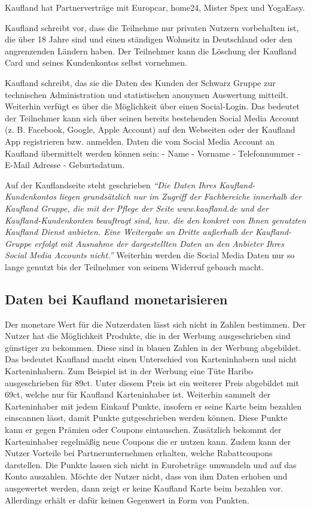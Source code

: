 \noindent Kaufland hat Partnerverträge mit Europcar, home24, Mister Spex und YogaEasy. \cite{Kaufland_FAQ} \newline

\noindent Kaufland schreibt vor, dass die Teilnehme nur privaten Nutzern vorbehalten ist, die über 18 Jahre sind und einen ständigen Wohnsitz in Deutschland oder den angrenzenden Ländern haben. Der Teilnehmer kann die Löschung der Kaufland Card und seines Kundenkontos selbst vornehmen. \cite{Kaufland_Datenschutz} \newline

\noindent Kaufland schreibt, das sie die Daten des Kunden der Schwarz Gruppe zur technischen Administration und statistischen anonymen Auswertung mitteilt. Weiterhin verfügt es über die Möglichkeit über einen Social-Login. Das bedeutet der Teilnehmer kann sich über seinen bereits bestehenden Social Media Account (z. B. Facebook, Google, Apple Account) auf den Webseiten oder der Kaufland App registrieren bzw. anmelden. Daten die vom Social Media Account an Kaufland übermittelt werden können sein: 
- Name
- Vorname
- Telefonnummer
- E-Mail Adresse
- Geburtsdatum. \newline

\noindent Auf der Kauflandseite steht geschrieben \textit{``Die Daten Ihres Kaufland-Kundenkontos liegen grundsätzlich nur im Zugriff der Fachbereiche innerhalb der Kaufland Gruppe, die mit der Pflege der Seite www.kaufland.de und der Kaufland-Kundenkonten beauftragt sind, bzw. die den konkret von Ihnen genutzten Kaufland Dienst anbieten. Eine Weitergabe an Dritte außerhalb der Kaufland-Gruppe erfolgt mit Ausnahme der dargestellten Daten an den Anbieter Ihres Social Media Accounts nicht.'' \cite{Kaufland_Rechtliches}} Weiterhin werden die Social Media Daten nur so lange genutzt bis der Teilnehmer von seinem Widerruf gebauch macht.

\subsection{Daten bei Kaufland monetarisieren}
Der monetare Wert für die Nutzerdaten lässt sich nicht in Zahlen bestimmen.
Der Nutzer hat die Möglichkeit Produkte, die in der Werbung ausgeschrieben sind günstiger zu bekommen. Diese sind in blauen Zahlen in der Werbung abgebildet. Das bedeutet Kaufland macht einen Unterschied von Karteninhabern und nicht Karteninhabern. Zum Beispiel ist in der Werbung eine Tüte Haribo ausgeschrieben für 89ct. Unter diesem Preis ist ein weiterer Preis abgebildet mit 69ct, welche nur für Kaufland Karteninhaber ist.
Weiterhin sammelt der Karteninhaber mit jedem Einkauf Punkte, insofern er seine Karte beim bezahlen einscannen lässt, damit Punkte gutgeschrieben werden können. 
Diese Punkte kann er gegen Prämien oder Coupons eintauschen.
Zusätzlich bekommt der Karteninhaber regelmäßig neue Coupons die er nutzen kann.
Zudem kann der Nutzer Vorteile bei Partnerunternehmen erhalten, welche Rabattcoupons darstellen. 
Die Punkte lassen sich nicht in Eurobeträge umwandeln und auf das Konto auszahlen.
Möchte der Nutzer nicht, dass von ihm Daten erhoben und ausgewertet werden, dann zeigt er keine Kaufland Karte beim bezahlen vor. Allerdings erhält er dafür keinen Gegenwert in Form von Punkten.
